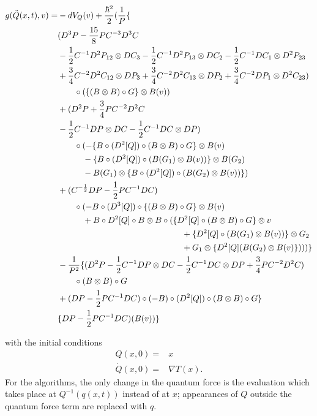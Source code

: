 \documentclass[11pt]{article}
\theoremstyle{remark}
\begin{document}
\[
\begin{split}
g(\ddot{Q}(x,t),v ) = & -dV_{Q} (v) + \frac{\ensuremath{\hbar}^2}{2}(
\frac{1}{P} \{
\\&
 (D^3 P - \frac{15}{8} P C^{-3} D^3C 
\\ &
- \frac{1}{2} C^{-1} D^2 P_{12} \otimes DC_3 
- \frac{1}{2} C^{-1} D^2 P_{13} \otimes DC_2 
- \frac{1}{2} C^{-1} DC_1 \otimes D^2P_{23} 
\\ & 
+ \frac{3}{4}  C^{-2} D^2C_{12} \otimes DP_3 
+ \frac{3}{4}  C^{-2} D^2C_{13} \otimes DP_2 
+ \frac{3}{4}  C^{-2} DP_1 \otimes D^2C_{23} )
\\&\qquad \circ ( \{(B\otimes B)\circ G\} \otimes B(v) )
\\ & 
+( D^2 P 
+ \frac{3}{4} P C^{-2} D^2C
\\ &
- \frac{1}{2} C^{-1} DP \otimes DC 
- \frac{1}{2} C^{-1} DC \otimes DP )
\\&\qquad \circ 
( -\{ B \circ (D^2 [Q])\circ (B
\otimes B)   \circ G \} \otimes B(v)  
\\ &\qquad \quad
- \{B \circ (D^2 [Q])\circ (B (G_1)
\otimes B( v))\} \otimes B(G_2)  
\\ & \qquad \quad
- B(G_1) \otimes \{B \circ (D^2 [Q])\circ (B (G_2)
\otimes B(v)) \}  )
\\ &
+(C^{-\frac{1}{2}} DP -
\frac{1}{2} P C^{-1} DC)
\\&
\qquad \circ (
 -B \circ (D^3 [Q]) \circ \{(B \otimes B) \circ G\} \otimes
B(v)
\\ & 
\qquad \quad + B \circ D^2 [Q] \circ B\otimes B \circ (
\{ D^2 [Q] \circ ( B \otimes B) \circ G\} \otimes v   \\
& \hspace{2.05in} + \{D^2 [Q] \circ ( B(G_1) \otimes B (v) )\}  \otimes
G_2  
\\& \hspace{2.05in} +  G_1 \otimes \{ D^2 [Q] ( B (G_2) \otimes B
(v)\}  ) ) )\}
\\ &
- \frac{1}{P^2}   
\{
( D^2 P 
- \frac{1}{2} C^{-1} DP \otimes DC 
- \frac{1}{2} C^{-1} DC \otimes DP 
+ \frac{3}{4} P C^{-2} D^2C )
\\&\qquad\circ(B\otimes B)\circ G
\\ &
+ ( DP -\frac{1}{2} P C^{-1} DC) \circ (-B) \circ (D^2 [Q])\circ (B
\otimes B) \circ G  \} 
\\ &
\{  DP -
\frac{1}{2} P C^{-1} DC) (B (v)) \}   
\end{split}   
\]

with the initial conditions
\begin{align*}
Q(x,0) =& x \\
\dot{Q}(x,0) =& \nabla T (x).  
\end{align*}
For the algorithms, the only change in the quantum force 
is the evaluation which takes place at 
$Q^{-1} (q(x,t))$ instead of at $x$;
 appearances of $Q$ outside the quantum force term
are replaced with $q$.  
\end{document}

